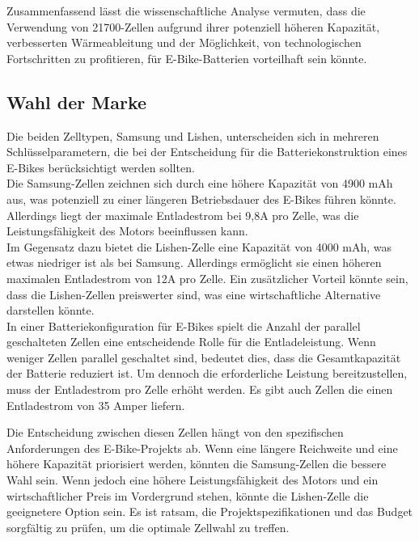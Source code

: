 
Zusammenfassend lässt die wissenschaftliche Analyse vermuten, dass die Verwendung von 21700-Zellen aufgrund ihrer potenziell höheren Kapazität, verbesserten Wärmeableitung und der Möglichkeit, von technologischen Fortschritten zu profitieren, für E-Bike-Batterien vorteilhaft sein könnte.

\subsection{Wahl der Marke}
Die beiden Zelltypen, Samsung und Lishen, unterscheiden sich in mehreren Schlüsselparametern, die bei der Entscheidung für die Batteriekonstruktion eines E-Bikes berücksichtigt werden sollten.\\

Die Samsung-Zellen zeichnen sich durch eine höhere Kapazität von 4900 mAh aus, was potenziell zu einer längeren Betriebsdauer des E-Bikes führen könnte. Allerdings liegt der maximale Entladestrom bei 9,8A pro Zelle, was die Leistungsfähigkeit des Motors beeinflussen kann. \\

Im Gegensatz dazu bietet die Lishen-Zelle eine Kapazität von 4000 mAh, was etwas niedriger ist als bei Samsung. Allerdings ermöglicht sie einen höheren maximalen Entladestrom von 12A pro Zelle. Ein zusätzlicher Vorteil könnte sein, dass die Lishen-Zellen preiswerter sind, was eine wirtschaftliche Alternative darstellen könnte.\\

In einer Batteriekonfiguration für E-Bikes spielt die Anzahl der parallel geschalteten Zellen eine entscheidende Rolle für die Entladeleistung. Wenn weniger Zellen parallel geschaltet sind, bedeutet dies, dass die Gesamtkapazität der Batterie reduziert ist. Um dennoch die erforderliche Leistung bereitzustellen, muss der Entladestrom pro Zelle erhöht werden. Es gibt auch Zellen die einen Entladestrom von 35 Amper liefern.

Die Entscheidung zwischen diesen Zellen hängt von den spezifischen Anforderungen des E-Bike-Projekts ab. Wenn eine längere Reichweite und eine höhere Kapazität priorisiert werden, könnten die Samsung-Zellen die bessere Wahl sein. Wenn jedoch eine höhere Leistungsfähigkeit des Motors und ein wirtschaftlicher Preis im Vordergrund stehen, könnte die Lishen-Zelle die geeignetere Option sein. Es ist ratsam, die Projektspezifikationen und das Budget sorgfältig zu prüfen, um die optimale Zellwahl zu treffen.\\

